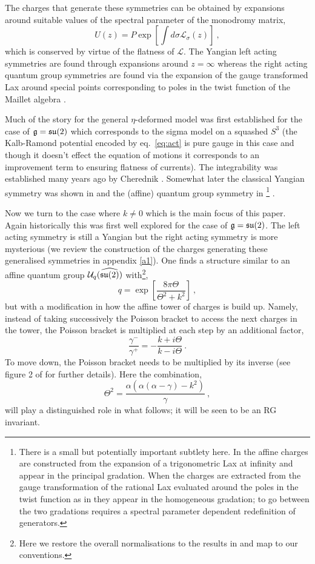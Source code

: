 \documentclass[12pt]{article}
\def\Lax{{\mathscr L}}
\def\ee{\boldsymbol{e}}
\def\be{\begin{equation}}
\def\ee{\end{equation}}
\begin{document}
 The charges that generate these symmetries can be obtained by expansions around suitable values of the spectral parameter of the monodromy matrix,
  \be
U(z)= P\exp\left[ \int d\sigma \Lax_\sigma(z) \right] \ ,    
  \ee
 which is conserved by virtue of the flatness of $\Lax$.   The Yangian left acting symmetries are found through expansions around $z=  \infty $ whereas  the right acting quantum group symmetries are found  \cite{Delduc:2013fga}  via the expansion of the gauge transformed Lax around special points corresponding to poles in the twist function of the Maillet algebra \cite{Maillet:1985ek}.  
 
 Much of the story for the general $\eta$-deformed model was first established for the case of $\frak{g} = \frak{su}(2)$ which corresponds to the sigma model on a squashed $S^3$ (the Kalb-Ramond potential encoded by  eq.~\eqref{eq:act} is pure gauge in this case and though it doesn't effect the equation of motions it corresponds to an improvement term to ensuring flatness of currents).  The integrability was established many years ago by Cherednik  \cite{Cherednik:1981df}. Somewhat later the classical Yangian symmetry was shown in \cite{Kawaguchi:2010jg} and the (affine) quantum group symmetry in \cite{Kawaguchi:2011pf,Kawaguchi:2012ve}\footnote{  There is a small but potentially important subtlety here.  In  \cite{ Kawaguchi:2012ve} the affine charges are constructed from the expansion of a trigonometric Lax at infinity and appear in the principal gradation.  When the charges are extracted from the gauge transformation of the rational Lax evaluated around the poles in the twist function as in \cite{Delduc:2017brb} they appear in the homogeneous gradation; to go between the two gradations requires a spectral parameter dependent redefinition of generators. } .
  
Now we turn to the case where $k\neq 0$ which is the main focus of this paper.   Again historically this was first well explored for the case of $\frak{g} = \frak{su}(2)$.  The left acting symmetry is still  a Yangian \cite{Kawaguchi:2011mz} but the right acting symmetry is more mysterious \cite{Kawaguchi:2013gma} (we review the construction of the charges generating these generalised symmetries in appendix \ref{a1}).  One finds a structure similar to an  affine quantum group ${\cal U}_q( \widehat{ \frak{su}(2) })$ with\footnote{Here we restore the overall normalisations to the results in   \cite{Kawaguchi:2013gma} and map to our conventions.},
 \be
 q = \exp\left[ \frac{ 8 \pi \Theta}{\Theta^2 + k^2}\right] \ ,
 \ee 
but with a modification in how the affine tower of charges is build up. Namely, instead of taking successively the Poisson bracket to access the next charges in the tower, the Poisson bracket is multiplied at each step by an additional factor,
 \be
  \frac{\gamma^-}{\gamma^+} =  -\frac{k + i \Theta}{k- i \Theta} \ .
 \ee
 To move down, the Poisson bracket needs to be multiplied by its inverse (see figure 2 of \cite{Kawaguchi:2013gma} for further details). Here the combination,
\be
\Theta^2  = \frac{\alpha  \left(\alpha  (\alpha -\gamma )-k^2\right)}{\gamma } \ ,
\ee 
   will play a distinguished role in what follows; it will be seen to be an RG invariant.  
   
\end{document}
